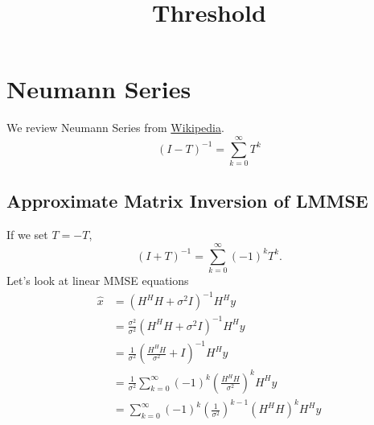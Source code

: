 \documentclass{article}
\title{Threshold}
\author{}
\date{}
\begin{document}
\maketitle

\section{Neumann Series}
We review Neumann Series from \href{https://en.wikipedia.org/wiki/Neumann_series}{Wikipedia}. 
\begin{equation}
(I-T)^{-1} = \sum_{k=0}^\infty T^k
\end{equation}
\subsection{Approximate Matrix Inversion of LMMSE}
If we set $T = -T$, 
\begin{equation}
(I + T)^{-1} = \sum_{k=0}^\infty (-1)^kT^k.
\end{equation}
Let's look at linear MMSE equations
\begin{equation}
\begin{split}
\hat{x} &= (H^HH + \sigma^2I)^{-1}H^Hy\\
&= \frac{\sigma^2}{\sigma^2}(H^HH + \sigma^2I)^{-1}H^Hy\\
&= \frac{1}{\sigma^2}(\frac{H^HH}{\sigma^2} + I)^{-1}H^Hy\\
&= \frac{1}{\sigma^2} \sum_{k=0}^\infty (-1)^k(\frac{H^HH}{\sigma^2})^k H^Hy \\
&= \sum_{k=0}^\infty (-1)^k(\frac{1}{\sigma^2})^{k-1}(H^HH)^k H^Hy
\end{split}
\end{equation}
\end{document}
